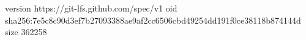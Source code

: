 version https://git-lfs.github.com/spec/v1
oid sha256:7e5c8c90d3ef7b27093388ae9af2cc6506cbd49254dd191f0ce38118b874144d
size 362258
